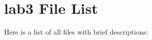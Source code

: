 \section{lab3 File List}
Here is a list of all files with brief descriptions:\begin{CompactList}
\item{}
\item{}
\item{}
\end{CompactList}

